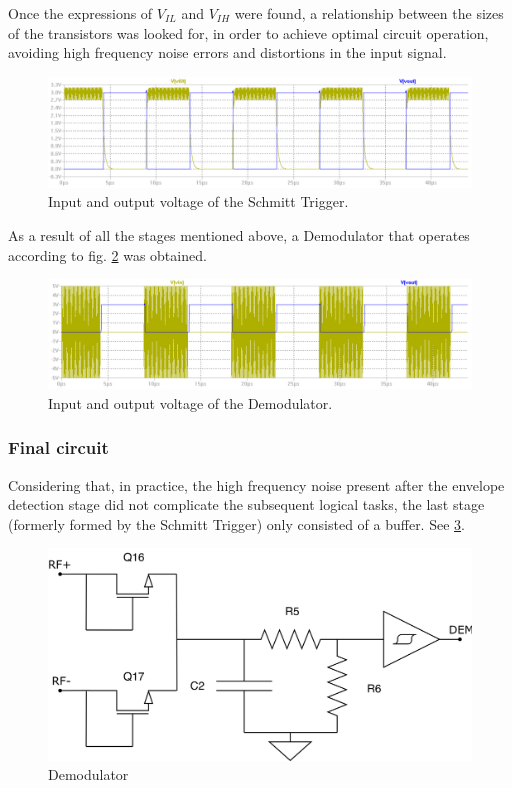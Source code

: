 \documentclass{article} %
\begin{document}
\begin{multicols}{2}
Once the expressions of $V_{IL}$ and $V_{IH}$ were found, a relationship between the sizes of the transistors was looked for, in order to achieve optimal circuit operation, avoiding high frequency noise errors and distortions in the input signal. 

\begin{figure}[H]
\centering
\includegraphics[scale=0.2]{Images/ImagenesTesina/Antecedentes/Sim_Schmit.png}
\caption{Input and output voltage of the Schmitt Trigger.}
\label{fig:Sim_Schmit}
\end{figure}

As a result of all the stages mentioned above, a Demodulator that operates according to fig. \ref{fig:Sim_demo} was obtained.

\begin{figure}[H]
\centering
\includegraphics[scale=0.2]{Images/ImagenesTesina/Antecedentes/Sim_Demo.png}
\caption{Input and output voltage of the Demodulator.}
\label{fig:Sim_demo}
\end{figure}


\subsubsection{Final circuit}
Considering that, in practice, the high frequency noise present after the envelope detection stage did not complicate the subsequent logical tasks, the last stage (formerly formed by the Schmitt Trigger) only consisted of a buffer. See  \ref{fig:demod}.

\begin{figure}[H]
\centering
\includegraphics[width=0.7\linewidth]{Images/ImagenesTesina/circuitos/DEM.png}
\caption{Demodulator}
\label{fig:demod}
\end{figure}




\end{multicols}
\end{document}
